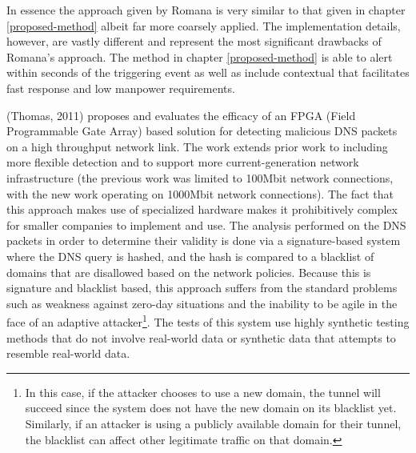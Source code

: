 \documentclass[12pt]{report}
\theoremstyle{remark}
\theoremstyle{definition}
\theoremstyle{definition}
\theoremstyle{definition}
\begin{document}
In essence the approach given by Romana is very similar to that given in chapter
\ref{proposed-method} albeit far more coarsely applied. The implementation
details, however, are vastly different and represent the most significant
drawbacks of Romana's approach. The method in chapter \ref{proposed-method} is
able to alert within seconds of the triggering event as well as include
contextual that facilitates fast response and low manpower requirements.

(Thomas, 2011)\cite{Thomas2011} proposes and evaluates the efficacy of an FPGA
(Field Programmable Gate Array) based solution for detecting malicious DNS
packets on a high throughput network link. The work extends prior work to
including more flexible detection and to support more current-generation network
infrastructure (the previous work was limited to 100Mbit network connections,
with the new work operating on 1000Mbit network connections). The fact that this
approach makes use of specialized hardware makes it prohibitively complex for
smaller companies to implement and use. The analysis performed on the DNS
packets in order to determine their validity is done via a signature-based
system where the DNS query is hashed, and the hash is compared to a blacklist of
domains that are disallowed based on the network policies. Because this is
signature and blacklist based, this approach suffers from the standard problems
such as weakness against zero-day situations and the inability to be agile in
the face of an adaptive attacker\footnote{In this case, if the attacker chooses
to use a new domain, the tunnel will succeed since the system does not have the
new domain on its blacklist yet. Similarly, if an attacker is using a publicly
available domain for their tunnel, the blacklist can affect other legitimate
traffic on that domain.}. The tests of this system use highly synthetic testing
methods that do not involve real-world data or synthetic data that attempts to
resemble real-world data.
\end{document}
